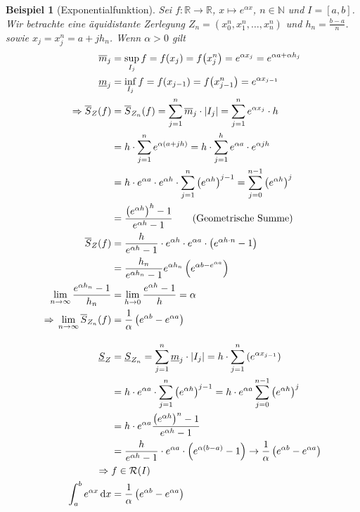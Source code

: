 \documentclass[11pt, twoside, a4paper]{article}
\theoremstyle{plain}
\newtheorem{beispiel}[blockelement]{Beispiel}
\numberwithin{equation}{subsection}
\newcommand{\pair}[1]{\left(#1\right)}
\newcommand{\of}[1]{\mathopen{}\mathclose{}\bgroup\left(#1\aftergroup\egroup\right)}
\newcommand{\abs}[1]{\left\lvert#1\right\rvert}
\newcommand{\interv}[1]{\left[#1\right]}
\newcommand{\impl}[0]{\Rightarrow{}}
\newcommand{\fromto}{\rightarrow{}}
\newcommand{\dif}{\mathop{}\!\mathrm{d}}
\newcommand{\R}{\mathbb{R}}
\newcommand{\N}{\mathbb{N}}
\newcommand{\mR}{\mathcal{R}}
\begin{document}
    \begin{beispiel}[Exponentialfunktion]
        \marginnote{[23. Apr]}
        Sei $f: \R\fromto\R$, $x\mapsto e^{\alpha x}$, $n\in\N$ und $I=\interv{a,b}$. Wir betrachte eine äquidistante Zerlegung $Z_n = \pair{x_0^n, x_1^n, \dots, x_n^n}$ und $h_n = \frac{b-a}{n}$. sowie $x_j = x_j^n=a+jh_n$. Wenn $\alpha > 0$ gilt
        \begin{align*}
            \overline{m}_j &= \sup_{I_j} f = f\of{x_j} = f\of{x_j^n} = e^{\alpha x_j} = e^{\alpha a + \alpha h_j}\\
            \underline{m}_j &= \inf_{I_j} f = f\of{x_{j-1}} = f\of{x_{j-1}^n} = e^{\alpha x_{j-1}}\\
            \impl \overline{S}_Z\of{f} &= \overline{S}_{Z_n}\of{f} = \sum_{j=1}^{n} \overline{m}_j \cdot\abs{I_j} = \sum_{j=1}^{n} e^{\alpha x_j} \cdot h\\
            &= h\cdot \sum_{j=1}^{n} e^{\alpha\pair{a+jh}} = h\cdot \sum_{j=1}^{h} e^{\alpha a}\cdot e^{\alpha jh}\\
            &= h\cdot e^{\alpha a}\cdot e^{\alpha h}\cdot \sum_{j=1}^{n} \pair{e^{\alpha h}}^{j-1} = \sum_{j=0}^{n-1} \pair{e^{\alpha h}}^{j}\\
            &= \frac{\pair{e^{\alpha h}}^h - 1}{e^{\alpha h} - 1}\tag{Geometrische Summe}\\
            \overline{S}_Z\of{f} &= \frac{h}{e^{\alpha h} - 1}\cdot e^{\alpha h}\cdot e^{\alpha a} \cdot \pair{e^{\alpha h\cdot n} - 1}\\
            &= \frac{h_n}{e^{\alpha h_n } - 1} e^{\alpha h_n} \pair{e^{\alpha b - e^{\alpha a}}}\\
            \lim_{n\fromto\infty} \frac{e^{\alpha h_n} - 1}{h_n} &= \lim_{h\fromto0} \frac{e^{\alpha h} - 1}{h} = \alpha\\
            \impl \lim_{n\fromto\infty} \overline{S}_{Z_n}\of{f} &= \frac{1}{\alpha}\pair{e^{\alpha b} - e^{\alpha a}}\\[10pt]
            \underline{S}_Z &= \underline{S}_{Z_n} = \sum_{j=1}^{n} \underline{m}_j \cdot \abs{I_j} = h\cdot \sum_{j=1}^{n} \pair{e^{\alpha x_{j-1}}}\\
            &= h\cdot e^{\alpha a}\cdot \sum_{j=1}^{n} \pair{e^{\alpha h}}^{j-1} = h\cdot e^{\alpha a} \sum_{j=0}^{n-1} \pair{e^{\alpha h}}^j\\
            &= h\cdot e^{\alpha a} \frac{\pair{e^{\alpha h}}^n - 1}{e^{\alpha h} - 1}\\
            &= \frac{h}{e^{\alpha h} - 1}\cdot e^{\alpha a}\cdot\pair{e^{\alpha\pair{b-a}} - 1} \fromto \frac{1}{\alpha} \pair{e^{\alpha b} - e^{\alpha a}}\\
            \impl &f\in \mR\of{I}\\
            \int_{a}^{b} e^{\alpha x} \dif x &= \frac{1}{\alpha} \pair{e^{\alpha b} - e^{\alpha a}}
        \end{align*}
    \end{beispiel}
\end{document}
